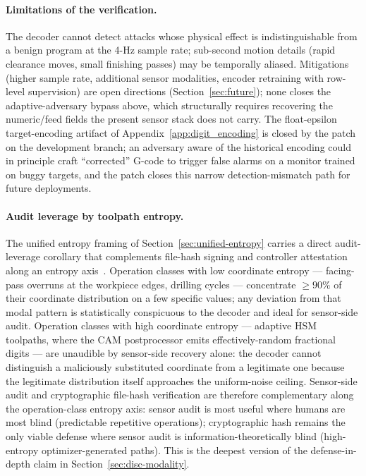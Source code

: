 \documentclass[sensors,article,submit,moreauthors,pdftex]{Definitions/mdpi}
\begin{document}
\paragraph{Limitations of the verification.} The decoder cannot detect attacks whose physical effect is indistinguishable from a benign program at the 4-Hz sample rate; sub-second motion details (rapid clearance moves, small finishing passes) may be temporally aliased. Mitigations (higher sample rate, additional sensor modalities, encoder retraining with row-level supervision) are open directions (Section~\ref{sec:future}); none closes the adaptive-adversary bypass above, which structurally requires recovering the numeric/feed fields the present sensor stack does not carry. The float-epsilon target-encoding artifact of Appendix~\ref{app:digit_encoding} is closed by the patch on the development branch; an adversary aware of the historical encoding could in principle craft ``corrected'' G-code to trigger false alarms on a monitor trained on buggy targets, and the patch closes this narrow detection-mismatch path for future deployments.

\paragraph{Audit leverage by toolpath entropy.} The unified entropy framing of Section~\ref{sec:unified-entropy} carries a direct audit-leverage corollary that complements file-hash signing and controller attestation along an entropy axis~\cite{chhetri2017confidentiality}. Operation classes with low coordinate entropy --- facing-pass overruns at the workpiece edges, drilling cycles --- concentrate $\ge 90\%$ of their coordinate distribution on a few specific values; any deviation from that modal pattern is statistically conspicuous to the decoder and ideal for sensor-side audit. Operation classes with high coordinate entropy --- adaptive HSM toolpaths, where the CAM postprocessor emits effectively-random fractional digits --- are unaudible by sensor-side recovery alone: the decoder cannot distinguish a maliciously substituted coordinate from a legitimate one because the legitimate distribution itself approaches the uniform-noise ceiling. Sensor-side audit and cryptographic file-hash verification are therefore complementary along the operation-class entropy axis: sensor audit is most useful where humans are most blind (predictable repetitive operations); cryptographic hash remains the only viable defense where sensor audit is information-theoretically blind (high-entropy optimizer-generated paths). This is the deepest version of the defense-in-depth claim in Section~\ref{sec:disc-modality}.
\end{document}
